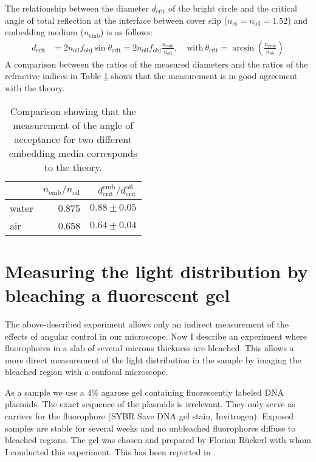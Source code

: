 The relationship between the diameter $d_\textrm{crit}$ of the bright
circle and the critical angle of total reflection at the interface
between cover slip ($n_\textrm{cs}=n_\textrm{oil}=1.52$) and embedding
medium ($n_\textrm{emb}$) is as follows:
\begin{align}
  d_\textrm{crit} &= 2 n_\textrm{oil} f_\textrm{obj}
  \sin\theta_\textrm{crit}= 2 n_\textrm{oil} f_\textrm{obj}
  \frac{n_\textrm{emb}}{n_{oil}},\quad \textrm{with}\ 
  \theta_\textrm{crit}=\arcsin\left(\frac{n_\textrm{emb}}{n_{oil}}\right)
\end{align}
A comparison between the ratios of the measured diameters and the
ratios of the refractive indices in Table \ref{tab:acceptance} shows
that the measurement is in good agreement with the theory.
\begin{table}[!hbt]
  \centering
  \begin{tabular}{ l r r }
\toprule
    & $n_\textrm{emb}/n_\textrm{oil}$ & $d^\textrm{emb}_\textrm{crit}/ d^\textrm{oil}_\textrm{crit}$ \\  \midrule
    water & 0.875 & $0.88\pm0.05$ \\
    air & 0.658 & $0.64\pm0.04$ \\
\bottomrule
  \end{tabular}
  \caption{Comparison showing that the measurement of the angle of acceptance for two different embedding media corresponds to the theory.}
  \label{tab:acceptance}
\end{table}


\section{Measuring the light distribution by bleaching a fluorescent gel}
The above-described experiment allows only an indirect measurement of the
effects of angular control in our microscope. Now I describe an
experiment where fluorophores in a slab of several microns thickness
are bleached. This allows a more direct measurement of the light
distribution in the sample by imaging the bleached region with a
confocal microscope.

As a sample we use a 4\% agarose gel containing fluorescently labeled
DNA plasmids. The exact sequence of the plasmids is irrelevant. They
only serve as carriers for the fluorophore (SYBR Save DNA gel stain,
Invitrogen). Exposed samples are stable for several weeks and no
unbleached fluorophores diffuse to bleached regions. The gel was
chosen and prepared by Florian R\"uckerl with whom I conducted this
experiment. This has been reported in \cite{Ruckerl}.

